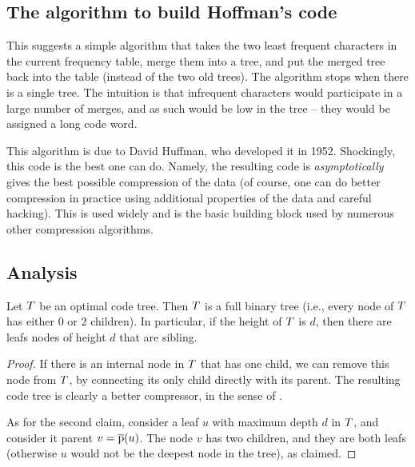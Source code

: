 \subsection{The algorithm to build Hoffman's code}

This suggests a simple algorithm that takes the two least frequent
characters in the current frequency table, merge them into a tree, and
put the merged tree back into the table (instead of the two old
trees). The algorithm stops when there is a single tree. The intuition
is that infrequent characters would participate in a large number of
merges, and as such would be low in the tree -- they would be assigned
a long code word. 

This algorithm is due to David Huffman, who developed it in
1952. Shockingly, this code is the best one can do. Namely, the
resulting code is \emph{asymptotically} gives the best possible
compression of the data (of course, one can do better compression in
practice using additional properties of the data and careful
hacking). This  is used widely and is the basic
building block used by numerous other compression algorithms.



\subsection{Analysis}

\begin{lemma}
    Let $T$ be an optimal code tree. Then $T$ is a full binary
    tree (i.e., every node of $T$ has either $0$ or $2$ children).
    In particular, if the height of $T$ is $d$, then there are
    leafs nodes of height $d$ that are sibling.
\end{lemma}

\begin{proof}
    If there is an internal node in $T$ that has one child, we can
    remove this node from $T$, by connecting its only child directly
    with its parent. The resulting code tree is clearly a better
    compressor, in the sense of .

    As for the second claim, consider a leaf $u$ with maximum depth
    $d$ in $T$, and consider it parent $v = \parentX{u}$. The node
    $v$ has two children, and they are both leafs (otherwise $u$ would
    not be the deepest node in the tree), as claimed.
\end{proof}


